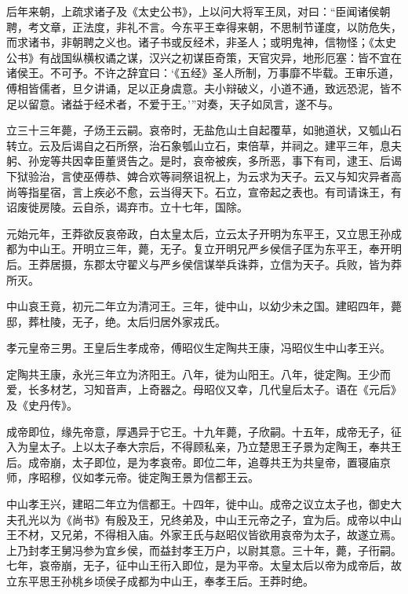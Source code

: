 \documentclass[12pt,UTF8]{ctexbook}
\begin{document}
后年来朝，上疏求诸子及《太史公书》，上以问大将军王凤，对曰：“臣闻诸侯朝聘，考文章，正法度，非礼不言。今东平王幸得来朝，不思制节谨度，以防危失，而求诸书，非朝聘之义也。诸子书或反经术，非圣人；或明鬼神，信物怪；《太史公书》有战国纵横权谲之谋，汉兴之初谋臣奇策，天官灾异，地形厄塞：皆不宜在诸侯王。不可予。不许之辞宜曰：‘《五经》圣人所制，万事靡不毕载。王审乐道，傅相皆儒者，旦夕讲诵，足以正身虞意。夫小辩破义，小道不通，致远恐泥，皆不足以留意。诸益于经术者，不爱于王。’”对奏，天子如凤言，遂不与。



立三十三年薨，子炀王云嗣。哀帝时，无盐危山土自起覆草，如驰道状，又瓠山石转立。云及后谒自之石所祭，治石象瓠山立石，束倍草，并祠之。建平三年，息夫躬、孙宠等共因幸臣董贤告之。是时，哀帝被疾，多所恶，事下有司，逮王、后谒下狱验治，言使巫傅恭、婢合欢等祠祭诅祝上，为云求为天子。云又与知灾异者高尚等指星宿，言上疾必不愈，云当得天下。石立，宣帝起之表也。有司请诛王，有诏废徙房陵。云自杀，谒弃市。立十七年，国除。



元始元年，王莽欲反哀帝政，白太皇太后，立云太子开明为东平王，又立思王孙成都为中山王。开明立三年，薨，无子。复立开明兄严乡侯信子匡为东平王，奉开明后。王莽居摄，东郡太守翟义与严乡侯信谋举兵诛莽，立信为天子。兵败，皆为莽所灭。



中山哀王竟，初元二年立为清河王。三年，徙中山，以幼少未之国。建昭四年，薨邸，葬杜陵，无子，绝。太后归居外家戎氏。



孝元皇帝三男。王皇后生孝成帝，傅昭仪生定陶共王康，冯昭仪生中山孝王兴。



定陶共王康，永光三年立为济阳王。八年，徙为山阳王。八年，徙定陶。王少而爱，长多材艺，习知音声，上奇器之。母昭仪又幸，几代皇后太子。语在《元后》及《史丹传》。



成帝即位，缘先帝意，厚遇异于它王。十九年薨，子欣嗣。十五年，成帝无子，征入为皇太子。上以太子奉大宗后，不得顾私亲，乃立楚思王子景为定陶王，奉共王后。成帝崩，太子即位，是为孝哀帝。即位二年，追尊共王为共皇帝，置寝庙京师，序昭穆，仪如孝元帝。徙定陶王景为信都王云。



中山孝王兴，建昭二年立为信都王。十四年，徙中山。成帝之议立太子也，御史大夫孔光以为《尚书》有殷及王，兄终弟及，中山王元帝之子，宜为后。成帝以中山王不材，又兄弟，不得相入庙。外家王氏与赵昭仪皆欲用哀帝为太子，故遂立焉。上乃封孝王舅冯参为宜乡侯，而益封孝王万户，以尉其意。三十年，薨，子衎嗣。七年，哀帝崩，无子，征中山王衎入即位，是为平帝。太皇太后以帝为成帝后，故立东平思王孙桃乡顷侯子成都为中山王，奉孝王后。王莽时绝。
\end{document}
